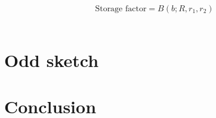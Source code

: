 \documentclass[a4paper,11pt]{article}
\begin{document}
\begin{equation}
    \text {Storage factor} = B(b;R,r_1,r_2)
\end{equation}\\

\section{Odd sketch}

\section{Conclusion}
\newpage

\end{document}

